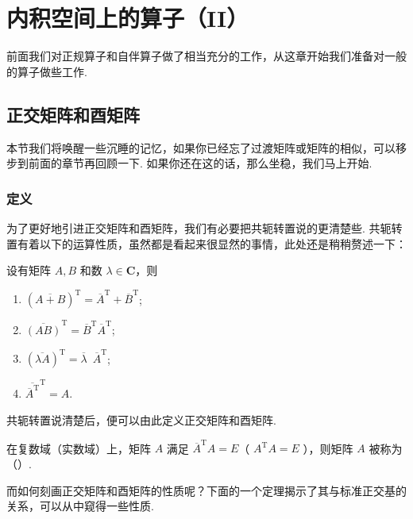 \chapter{内积空间上的算子（II）}

前面我们对正规算子和自伴算子做了相当充分的工作，从这章开始我们准备对一般的算子做些工作.

\section{正交矩阵和酉矩阵}

本节我们将唤醒一些沉睡的记忆，如果你已经忘了过渡矩阵或矩阵的相似，可以移步到前面的章节再回顾一下. 如果你还在这的话，那么坐稳，我们马上开始.

\subsection{定义}

为了更好地引进正交矩阵和酉矩阵，我们有必要把共轭转置说的更清楚些. 共轭转置有着以下的运算性质，虽然都是看起来很显然的事情，此处还是稍稍赘述一下：

设有矩阵 $ A, B $ 和数 $ \lambda \in \mathbf{C}$，则

\begin{enumerate}
    \item $ (\overline{A + B})^{\mathrm{T}} = \overline{A}^{\mathrm{T}} + \overline{B}^{\mathrm{T}} $;

    \item $ \overline{(AB)}^{\mathrm{T}} = \overline{B}^{\mathrm{T}} \overline{A}^{\mathrm{T}} $;

    \item $ (\overline{\lambda A})^{\mathrm{T}} = \overline{\lambda} \enspace \overline{A}^{\mathrm{T}} $;

    \item $ \overline{\overline{A}^{\mathrm{T}}}^{\mathrm{T}} = A $.
\end{enumerate}

共轭转置说清楚后，便可以由此定义正交矩阵和酉矩阵.

\begin{definition}  
    在复数域（实数域）上，矩阵 $ A $ 满足 $ \overline{A}^{\mathrm{T}} A = E $（ $ {A}^{\mathrm{T}} A = E $ ），则矩阵 $ A $ 被称为（）.
\end{definition}

而如何刻画正交矩阵和酉矩阵的性质呢？下面的一个定理揭示了其与标准正交基的关系，可以从中窥得一些性质.

